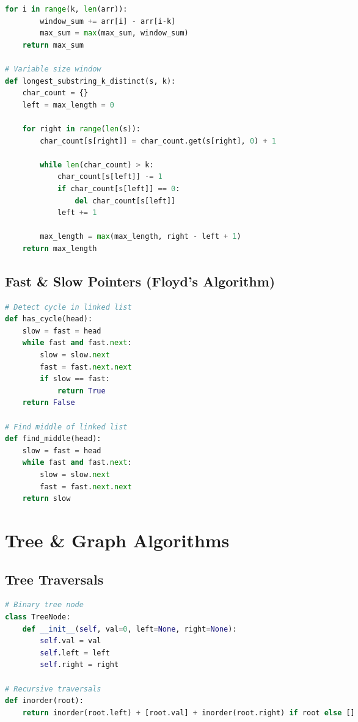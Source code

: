 \documentclass[9pt,a4paper]{article}
\begin{document}
\begin{multicols}{2}
\begin{lstlisting}[language=Python]
    for i in range(k, len(arr)):
        window_sum += arr[i] - arr[i-k]
        max_sum = max(max_sum, window_sum)
    return max_sum

# Variable size window
def longest_substring_k_distinct(s, k):
    char_count = {}
    left = max_length = 0
    
    for right in range(len(s)):
        char_count[s[right]] = char_count.get(s[right], 0) + 1
        
        while len(char_count) > k:
            char_count[s[left]] -= 1
            if char_count[s[left]] == 0:
                del char_count[s[left]]
            left += 1
        
        max_length = max(max_length, right - left + 1)
    return max_length
\end{lstlisting}

\subsection*{Fast \& Slow Pointers (Floyd's Algorithm)}
\begin{lstlisting}[language=Python]
# Detect cycle in linked list
def has_cycle(head):
    slow = fast = head
    while fast and fast.next:
        slow = slow.next
        fast = fast.next.next
        if slow == fast:
            return True
    return False

# Find middle of linked list
def find_middle(head):
    slow = fast = head
    while fast and fast.next:
        slow = slow.next
        fast = fast.next.next
    return slow
\end{lstlisting}

\columnbreak

\section*{Tree \& Graph Algorithms}

\subsection*{Tree Traversals}
\begin{lstlisting}[language=Python]
# Binary tree node
class TreeNode:
    def __init__(self, val=0, left=None, right=None):
        self.val = val
        self.left = left
        self.right = right

# Recursive traversals
def inorder(root):
    return inorder(root.left) + [root.val] + inorder(root.right) if root else []


\end{lstlisting}
\end{multicols}
\end{document}
